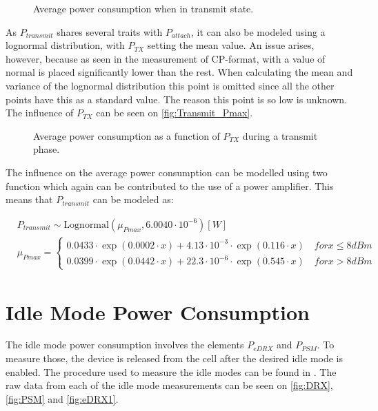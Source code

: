 \begin{figure}[H]
\centering
\begin{minipage}{0.48\textwidth}
\resizebox{\textwidth}{!}{
}
\end{minipage}
\hfill
\begin{minipage}{0.48\textwidth}
\resizebox{\textwidth}{!}{
}
\end{minipage}
\caption{Average power consumption when in transmit state.}
\label{fig:Transmit_Points}
\end{figure}

As $P_{transmit}$ shares several traits with $P_{attach}$, it can also be modeled using a lognormal distribution, with $P_{TX}$ setting the mean value. An issue arises, however, because as seen in the measurement of CP-format, with a value of normal is placed significantly lower than the rest. When calculating the mean and variance of the lognormal distribution this point is omitted since all the other points have this as a standard value. The reason this point is so low is unknown. The influence of $P_{TX}$ can be seen on \autoref{fig:Transmit_Pmax}. 

\begin{figure}[H]
\centering
{}
\resizebox{0.7\textwidth}{!}{
}
\caption{Average power consumption as a function of $P_{TX}$ during a transmit phase.}
\label{fig:Transmit_Pmax}
\end{figure}

The influence on the average power consumption can be modelled using two function which again can be contributed to the use of a power amplifier. This means that $P_{transmit}$ can be modeled as:

\begin{align}
&P_{transmit} \sim \text{Lognormal}(\mu_{Pmax},6.0040\cdot 10^{-6}) [W]\\ \nonumber
&\mu_{Pmax} = \begin{cases} 0.0433\cdot\exp{(0.0002\cdot x)} + 4.13\cdot10^{-3}\cdot\exp{(0.116\cdot x)} \quad for x \leq 8 dBm \\
0.0399\cdot\exp{(0.0442\cdot x)} + 22.3\cdot10^{-6}\cdot\exp{(0.545\cdot x)} \quad for x > 8 dBm \end{cases}
\end{align}


\section{Idle Mode Power Consumption}
The idle mode power consumption involves the elements $P_{eDRX}$ and $P_{PSM}$. To measure those, the device is released from the cell after the desired idle mode is enabled. The procedure used to measure the idle modes can be found in . The raw data from each of the idle mode measurements can be seen on \autoref{fig:DRX}, \autoref{fig:PSM} and \autoref{fig:eDRX1}.

